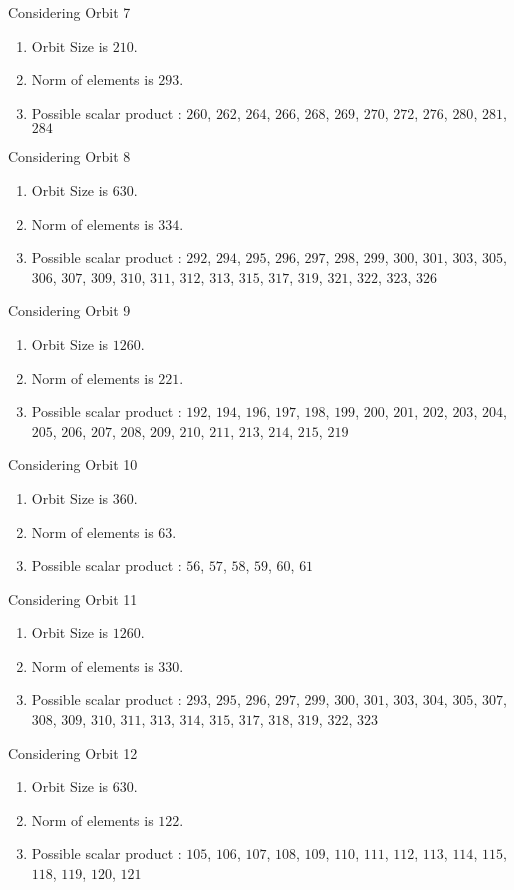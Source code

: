 \documentclass[12pt]{article}
\begin{document}
Considering Orbit 7
\begin{enumerate}
\item Orbit Size is $210$.
\item Norm of elements is $293$.
\item Possible scalar product : $260$, $262$, $264$, $266$, $268$, $269$, $270$, $272$, $276$, $280$, $281$, $284$
\end{enumerate}
Considering Orbit 8
\begin{enumerate}
\item Orbit Size is $630$.
\item Norm of elements is $334$.
\item Possible scalar product : $292$, $294$, $295$, $296$, $297$, $298$, $299$, $300$, $301$, $303$, $305$, $306$, $307$, $309$, $310$, $311$, $312$, $313$, $315$, $317$, $319$, $321$, $322$, $323$, $326$
\end{enumerate}
Considering Orbit 9
\begin{enumerate}
\item Orbit Size is $1260$.
\item Norm of elements is $221$.
\item Possible scalar product : $192$, $194$, $196$, $197$, $198$, $199$, $200$, $201$, $202$, $203$, $204$, $205$, $206$, $207$, $208$, $209$, $210$, $211$, $213$, $214$, $215$, $219$
\end{enumerate}
Considering Orbit 10
\begin{enumerate}
\item Orbit Size is $360$.
\item Norm of elements is $63$.
\item Possible scalar product : $56$, $57$, $58$, $59$, $60$, $61$
\end{enumerate}
Considering Orbit 11
\begin{enumerate}
\item Orbit Size is $1260$.
\item Norm of elements is $330$.
\item Possible scalar product : $293$, $295$, $296$, $297$, $299$, $300$, $301$, $303$, $304$, $305$, $307$, $308$, $309$, $310$, $311$, $313$, $314$, $315$, $317$, $318$, $319$, $322$, $323$
\end{enumerate}
Considering Orbit 12
\begin{enumerate}
\item Orbit Size is $630$.
\item Norm of elements is $122$.
\item Possible scalar product : $105$, $106$, $107$, $108$, $109$, $110$, $111$, $112$, $113$, $114$, $115$, $118$, $119$, $120$, $121$
\end{enumerate}
\end{document}
